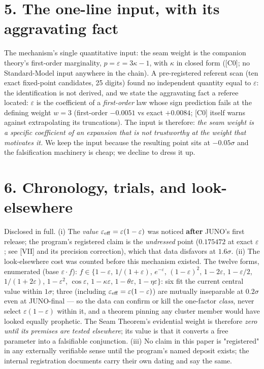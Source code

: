 \documentclass[11pt]{article}
\begin{document}
\section*{5. The one-line input, with its aggravating fact}
The mechanism's single quantitative input: the seam weight is the companion theory's first-order marginality, $p = \varepsilon = 3\kappa - 1$, with $\kappa$ in closed form ([C0]; no Standard-Model input anywhere in the chain).  A pre-registered referent scan (ten exact fixed-point candidates, 25 digits) found no independent quantity equal to $\varepsilon$: the identification is not derived, and we state the aggravating fact a referee located: $\varepsilon$ is the coefficient of a \emph{first-order} law whose sign prediction fails at the defining weight $w = 3$ (first-order $-0.0051$ vs exact $+0.0084$; [C0] itself warns against extrapolating its truncations).  The input is therefore: \emph{the seam weight is a specific coefficient of an expansion that is not trustworthy at the weight that motivates it.}  We keep the input because the resulting point sits at $-0.05\sigma$ and the falsification machinery is cheap; we decline to dress it up.

\section*{6. Chronology, trials, and look-elsewhere}
Disclosed in full.  (i) The \emph{value} $\varepsilon_{\rm eff} = \varepsilon(1-\varepsilon)$ was noticed \textbf{after} JUNO's first release; the program's registered claim is the \emph{undressed} point ($0.175472$ at exact $\varepsilon$; see [VII] and its precision correction), which that data disfavors at $1.6\sigma$.  (ii) The look-elsewhere cost was counted before this mechanism existed. The twelve forms, enumerated (base $\varepsilon\cdot f$): $f \in \{1-\varepsilon$, $1/(1+\varepsilon)$, $e^{-\varepsilon}$, $(1-\varepsilon)^2$, $1-2\varepsilon$, $1-\varepsilon/2$, $1/(1+2\varepsilon)$, $1-\varepsilon^2$, $\cos\varepsilon$, $1-\kappa\varepsilon$, $1-\theta\varepsilon$, $1-\eta\varepsilon\}$: six fit the current central value within $1\sigma$; three (including $\varepsilon_{\rm eff} = \varepsilon(1-\varepsilon)$) are mutually inseparable at $0.2\sigma$ even at JUNO-final — so the data can confirm or kill the one-factor \emph{class}, never select $\varepsilon(1-\varepsilon)$ within it, and a theorem pinning any cluster member would have looked equally prophetic.  The Seam Theorem's evidential weight is therefore \emph{zero until its premises are tested elsewhere}; its value is that it converts a free parameter into a falsifiable conjunction.  (iii) No claim in this paper is "registered" in any externally verifiable sense until the program's named deposit exists; the internal registration documents carry their own dating and say the same.
\end{document}
